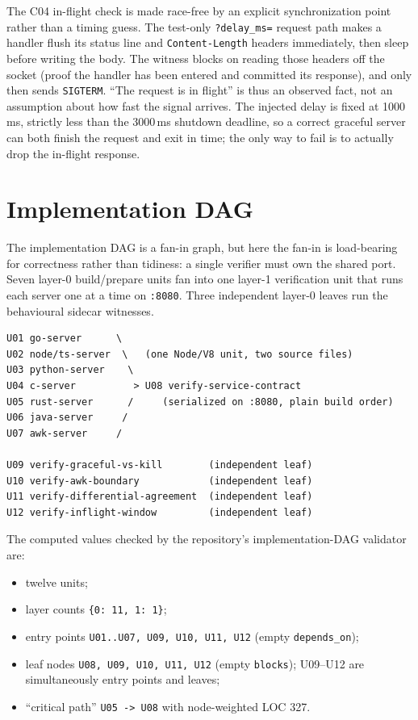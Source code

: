 \documentclass[11pt,letterpaper]{article}
\begin{document}
The C04 in-flight check is made race-free by an explicit synchronization
point rather than a timing guess. The test-only \texttt{?delay\_ms=}
request path makes a handler flush its status line and
\texttt{Content-Length} headers immediately, then sleep before writing
the body. The witness blocks on reading those headers off the socket
(proof the handler has been entered and committed its response), and
only then sends \texttt{SIGTERM}. ``The request is in flight'' is thus
an observed fact, not an assumption about how fast the signal arrives.
The injected delay is fixed at 1000\,ms, strictly less than the
3000\,ms shutdown deadline, so a correct graceful server can both finish
the request and exit in time; the only way to fail is to actually drop
the in-flight response.

\section{Implementation DAG}

The implementation DAG is a fan-in graph, but here the fan-in is
load-bearing for correctness rather than tidiness: a single verifier
must own the shared port. Seven layer-0 build/prepare units fan into one
layer-1 verification unit that runs each server one at a time on
\texttt{:8080}. Three independent layer-0 leaves run the behavioural
sidecar witnesses.

\begin{lstlisting}
U01 go-server      \
U02 node/ts-server  \   (one Node/V8 unit, two source files)
U03 python-server    \
U04 c-server          > U08 verify-service-contract
U05 rust-server      /     (serialized on :8080, plain build order)
U06 java-server     /
U07 awk-server     /

U09 verify-graceful-vs-kill        (independent leaf)
U10 verify-awk-boundary            (independent leaf)
U11 verify-differential-agreement  (independent leaf)
U12 verify-inflight-window         (independent leaf)
\end{lstlisting}

The computed values checked by the repository's implementation-DAG
validator are:

\begin{itemize}
  \item twelve units;
  \item layer counts \texttt{\{0: 11, 1: 1\}};
  \item entry points \texttt{U01..U07, U09, U10, U11, U12} (empty \texttt{depends\_on});
  \item leaf nodes \texttt{U08, U09, U10, U11, U12} (empty \texttt{blocks});
        U09--U12 are simultaneously entry points and leaves;
  \item ``critical path'' \texttt{U05 -> U08} with node-weighted LOC 327.
\end{itemize}
\end{document}
